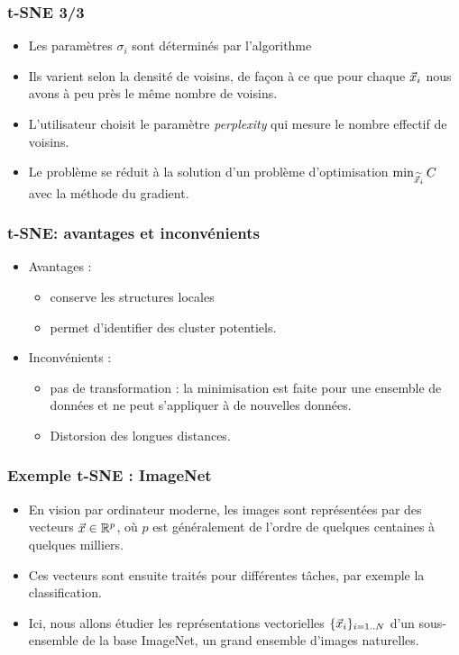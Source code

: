 \begin{frame}
\frametitle{t-SNE 3/3}
\begin{itemize}
	\item Les paramètres $\sigma_i$ sont déterminés par l'algorithme
	\item Ils varient selon la densité de voisins, de façon à ce que pour chaque $\vec{x}_i$ nous avons à peu près le même nombre de voisins. 
	\item L'utilisateur choisit le paramètre \textit{perplexity} qui mesure le nombre effectif de voisins. 
	\item Le problème se réduit à la solution d'un problème d'optimisation $\min_{\widetilde{\vec{x}_i}} C$ avec la méthode du gradient.
\end{itemize}
\end{frame}

\begin{frame}
\frametitle{t-SNE: avantages et inconvénients}
  \begin{itemize}
  	\item Avantages : 
  	\begin{itemize}
  		\item conserve les structures locales
  		\item permet d'identifier des cluster potentiels. 
  	\end{itemize}
  	\item Inconvénients : 
  	\begin{itemize}
  		\item pas de transformation : la minimisation est faite pour une ensemble de données et ne peut s'appliquer à de nouvelles données. 
  		\item Distorsion des longues distances. 
  	\end{itemize}
  \end{itemize}
\end{frame}


\begin{frame}
\frametitle{Exemple t-SNE : ImageNet}
\begin{itemize}
  \item En vision par ordinateur moderne, les images sont représentées par des vecteurs $\vec{x} \in {\mathbb R}^p$, où $p$ est généralement de l'ordre de quelques centaines à quelques milliers.
  \item Ces vecteurs sont ensuite traités pour différentes tâches, par exemple la classification.
  \item Ici, nous allons étudier les représentations vectorielles $\{\vec{x}_i\}_{i = 1..N}$ d'un sous-ensemble de la base ImageNet, un grand ensemble d'images naturelles.
\end{itemize}
\end{frame}

